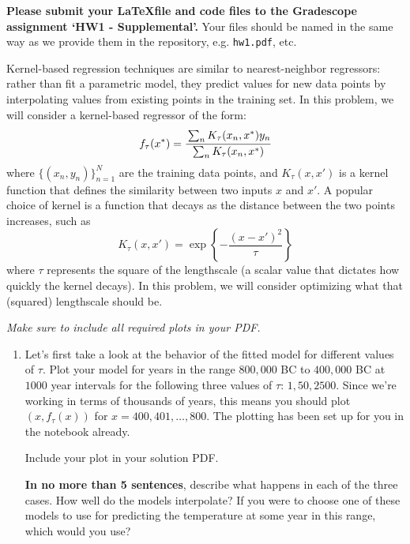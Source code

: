 \documentclass[submit]{harvardml}
\begin{document}
\textbf{Please submit your \LaTeX file and code files to the
  Gradescope assignment `HW1 - Supplemental'.} Your files should be
named in the same way as we provide them in the repository,
e.g. \texttt{hw1.pdf}, etc.


\begin{problem}
Kernel-based regression techniques are similar to nearest-neighbor
regressors: rather than fit a parametric model, they predict values
for new data points by interpolating values from existing points in
the training set.  In this problem, we will consider a kernel-based
regressor of the form:
\begin{equation*}
  f_\tau(x^*) = \cfrac{\sum_{n} K_\tau(x_n,x^*) y_n}{\sum_n K_\tau(x_n, x^*)} 
\end{equation*}
where $\{(x_n,y_n)\}_{n = 1} ^N$ are the training data points, and $K_\tau(x,x')$ is a
kernel function that defines the similarity between two inputs $x$ and
$x'$. A popular choice of kernel is a function that decays as the
distance between the two points increases, such as
\begin{equation*}
  K_\tau(x,x') = \exp\left\{-\frac{(x-x')^2}{\tau}\right\}
\end{equation*}
where $\tau$ represents the square of the lengthscale (a scalar value that 
dictates how quickly the kernel decays).  In this
problem, we will consider optimizing what that (squared) lengthscale
should be.

\noindent\emph{Make sure to include all required plots in your PDF.}

\begin{enumerate}
  
\item Let's first take a look at the behavior of the fitted model for different values of $\tau$. Plot your model for years in the range $800,000$ BC to $400,000$ BC at $1000$ year intervals for the following three values of $\tau$: $1, 50, 2500$. Since we're working in terms of thousands of years, this means you should plot $(x, f_\tau(x))$ for $x = 400, 401, \dots, 800$. The plotting has been set up for you in the notebook already.


Include your plot in your solution PDF.

\textbf{In no more than 5 sentences}, describe what happens in each of the three cases. How well do the models interpolate? If you were to choose one of these models to use for predicting the temperature at some year in this range, which would you use? 


\end{enumerate}
\end{problem}
\end{document}

